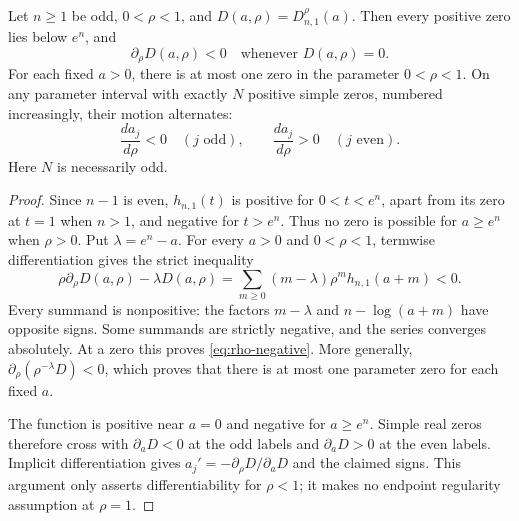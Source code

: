 \begin{theorem}
\label{thm:rho-direction}
Let $n\ge1$ be odd, $0<\rho<1$, and $D(a,\rho)=D_{n,1}^{\rho}(a)$.
Then every positive zero lies below $e^n$, and
\begin{equation}\label{eq:rho-negative}
 \partial_\rho D(a,\rho)<0\quad\text{whenever }D(a,\rho)=0.
\end{equation}
For each fixed $a>0$, there is at most one zero in the parameter
$0<\rho<1$. On any parameter interval with exactly $N$ positive
simple zeros, numbered increasingly, their motion alternates:
\begin{equation}\label{eq:alternating-motion}
 \frac{d a_j}{d\rho}<0\quad(j\text{ odd}),\qquad
 \frac{d a_j}{d\rho}>0\quad(j\text{ even}).
\end{equation}
Here $N$ is necessarily odd.
\end{theorem}
\begin{proof}
Since $n-1$ is even, $h_{n,1}(t)$ is positive for $0<t<e^n$,
apart from its zero at $t=1$ when $n>1$, and negative for $t>e^n$.
Thus no zero is possible for $a\ge e^n$ when $\rho>0$.
Put $\lambda=e^n-a$. For every $a>0$ and $0<\rho<1$, termwise
differentiation gives the strict inequality
\begin{equation}\label{eq:weighted-rho}
 \rho\partial_\rho D(a,\rho)-\lambda D(a,\rho)
 =\sum_{m\ge0}(m-\lambda)\rho^m h_{n,1}(a+m)<0.
\end{equation}
Every summand is nonpositive: the factors $m-\lambda$ and
$n-\log(a+m)$ have opposite signs. Some summands are strictly
negative, and the series converges absolutely. At a zero this proves
\eqref{eq:rho-negative}. More generally,
$\partial_\rho(\rho^{-\lambda}D)<0$, which proves that there is
at most one parameter zero for each fixed $a$.

The function is positive near $a=0$ and negative for $a\ge e^n$.
Simple real zeros therefore cross with $\partial_aD<0$ at the odd
labels and $\partial_aD>0$ at the even labels. Implicit
differentiation gives $a_j'=-\partial_\rho D/\partial_aD$ and the
claimed signs. This argument only asserts differentiability for
$\rho<1$; it makes no endpoint regularity assumption at $\rho=1$.
\end{proof}

